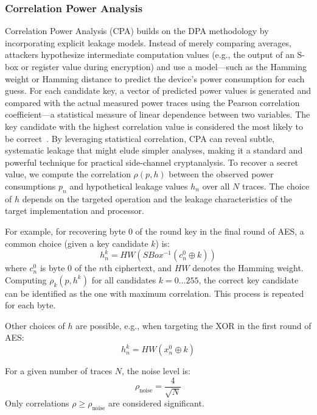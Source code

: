 \subsubsection{Correlation Power Analysis}
Correlation Power Analysis (CPA) builds on the DPA methodology by incorporating explicit leakage models. Instead of merely comparing averages, attackers hypothesize intermediate computation values (e.g., the output of an S-box or register value during encryption) and use a model—such as the Hamming weight or Hamming distance to
predict the device’s power consumption for each guess. For each candidate key, a vector of predicted power values is generated and compared with the actual measured power traces using the Pearson correlation coefficient—a statistical measure of linear dependence between two variables. The key candidate with the highest correlation value is considered the most likely to be correct~\cite{10.1007/978-3-540-28632-5_2}. By leveraging statistical correlation, CPA can reveal subtle, systematic leakage that might elude simpler analyses, making it a standard and powerful technique for practical side-channel cryptanalysis. To recover a secret value, we compute the correlation $\rho(p, h)$ between the observed power consumptions $p_n$ and hypothetical leakage values $h_n$ over all $N$ traces. The choice of $h$ depends on the targeted operation and the leakage characteristics of the target implementation and processor. 

For example, for recovering byte 0 of the round key in the final round of AES, a common choice (given a key candidate $k$) is:
\begin{equation}
h^k_n = HW\left(SBox^{-1}\left(c^0_n \oplus k\right)\right)
\end{equation}
where $c^0_n$ is byte 0 of the $n$th ciphertext, and $HW$ denotes the Hamming weight. Computing $\rho_k(p, h^k)$ for all candidates $k = 0 \dots 255$, the correct key candidate can be identified as the one with maximum correlation. This process is repeated for each byte. 

Other choices of $h$ are possible, e.g., when targeting the XOR in the first round of AES:
\begin{equation}
h^k_n = HW\left(x^0_n \oplus k\right)
\end{equation}

For a given number of traces $N$, the noise level is:
\begin{equation}
\rho_{\text{noise}} = \frac{4}{\sqrt{N}}
\end{equation}
Only correlations $\rho \geq \rho_{\text{noise}}$ are considered significant.

